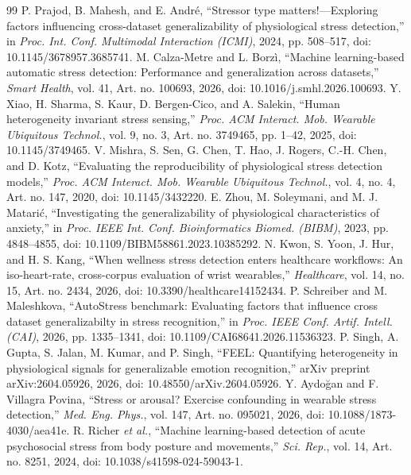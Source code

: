 \documentclass[journal]{IEEEtran}
\begin{document}
\begin{thebibliography}{99}
 P. Prajod, B. Mahesh, and E. Andr\'e, ``Stressor type matters!---Exploring factors influencing cross-dataset generalizability of physiological stress detection,'' in \emph{Proc. Int. Conf. Multimodal Interaction (ICMI)}, 2024, pp. 508--517, doi: 10.1145/3678957.3685741.
 M. Calza-Metre and L. Borz\`i, ``Machine learning-based automatic stress detection: Performance and generalization across datasets,'' \emph{Smart Health}, vol. 41, Art. no. 100693, 2026, doi: 10.1016/j.smhl.2026.100693.
 Y. Xiao, H. Sharma, S. Kaur, D. Bergen-Cico, and A. Salekin, ``Human heterogeneity invariant stress sensing,'' \emph{Proc. ACM Interact. Mob. Wearable Ubiquitous Technol.}, vol. 9, no. 3, Art. no. 3749465, pp. 1--42, 2025, doi: 10.1145/3749465.
 V. Mishra, S. Sen, G. Chen, T. Hao, J. Rogers, C.-H. Chen, and D. Kotz, ``Evaluating the reproducibility of physiological stress detection models,'' \emph{Proc. ACM Interact. Mob. Wearable Ubiquitous Technol.}, vol. 4, no. 4, Art. no. 147, 2020, doi: 10.1145/3432220.
 E. Zhou, M. Soleymani, and M. J. Matari\'c, ``Investigating the generalizability of physiological characteristics of anxiety,'' in \emph{Proc. IEEE Int. Conf. Bioinformatics Biomed. (BIBM)}, 2023, pp. 4848--4855, doi: 10.1109/BIBM58861.2023.10385292.
 N. Kwon, S. Yoon, J. Hur, and H. S. Kang, ``When wellness stress detection enters healthcare workflows: An iso-heart-rate, cross-corpus evaluation of wrist wearables,'' \emph{Healthcare}, vol. 14, no. 15, Art. no. 2434, 2026, doi: 10.3390/healthcare14152434.
 P. Schreiber and M. Maleshkova, ``AutoStress benchmark: Evaluating factors that influence cross dataset generalizabilty in stress recognition,'' in \emph{Proc. IEEE Conf. Artif. Intell. (CAI)}, 2026, pp. 1335--1341, doi: 10.1109/CAI68641.2026.11536323.
 P. Singh, A. Gupta, S. Jalan, M. Kumar, and P. Singh, ``FEEL: Quantifying heterogeneity in physiological signals for generalizable emotion recognition,'' arXiv preprint arXiv:2604.05926, 2026, doi: 10.48550/arXiv.2604.05926.
 Y. Aydo\u{g}an and F. Villagra Povina, ``Stress or arousal? Exercise confounding in wearable stress detection,'' \emph{Med. Eng. Phys.}, vol. 147, Art. no. 095021, 2026, doi: 10.1088/1873-4030/aea41e.
 R. Richer \emph{et al.}, ``Machine learning-based detection of acute psychosocial stress from body posture and movements,'' \emph{Sci. Rep.}, vol. 14, Art. no. 8251, 2024, doi: 10.1038/s41598-024-59043-1.

\end{thebibliography}
\end{document}
